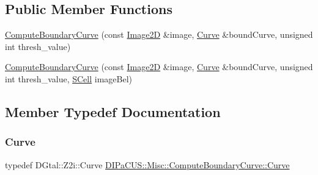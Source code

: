 \subsection*{Public Member Functions}
\begin{DoxyCompactItemize}
\item 
\mbox{\hyperlink{structDIPaCUS_1_1Misc_1_1ComputeBoundaryCurve_ae2d9570a6bc09a61cb38eb6375729f94}{Compute\+Boundary\+Curve}} (const \mbox{\hyperlink{structDIPaCUS_1_1Misc_1_1ComputeBoundaryCurve_a67511f091a6fb85b38f29a4df3f480dd}{Image2D}} \&image, \mbox{\hyperlink{structDIPaCUS_1_1Misc_1_1ComputeBoundaryCurve_ac3d7adcd3d9b37d2166c65346e0916d2}{Curve}} \&bound\+Curve, unsigned int thresh\+\_\+value)
\item 
\mbox{\hyperlink{structDIPaCUS_1_1Misc_1_1ComputeBoundaryCurve_a822855aabf08a913095310ab5a5acfa5}{Compute\+Boundary\+Curve}} (const \mbox{\hyperlink{structDIPaCUS_1_1Misc_1_1ComputeBoundaryCurve_a67511f091a6fb85b38f29a4df3f480dd}{Image2D}} \&image, \mbox{\hyperlink{structDIPaCUS_1_1Misc_1_1ComputeBoundaryCurve_ac3d7adcd3d9b37d2166c65346e0916d2}{Curve}} \&bound\+Curve, unsigned int thresh\+\_\+value, \mbox{\hyperlink{structDIPaCUS_1_1Misc_1_1ComputeBoundaryCurve_affd97ae2b7fea729fca28c9a4bb16fd5}{S\+Cell}} image\+Bel)
\end{DoxyCompactItemize}


\subsection{Member Typedef Documentation}
\mbox{\label{structDIPaCUS_1_1Misc_1_1ComputeBoundaryCurve_ac3d7adcd3d9b37d2166c65346e0916d2}} 
\subsubsection{\texorpdfstring{Curve}{Curve}}
{\footnotesize\ttfamily typedef D\+Gtal\+::\+Z2i\+::\+Curve \mbox{\hyperlink{structDIPaCUS_1_1Misc_1_1ComputeBoundaryCurve_ac3d7adcd3d9b37d2166c65346e0916d2}{D\+I\+Pa\+C\+U\+S\+::\+Misc\+::\+Compute\+Boundary\+Curve\+::\+Curve}}}

\mbox{\label{structDIPaCUS_1_1Misc_1_1ComputeBoundaryCurve_a7adb0e563e32b1096bde9f5a136e6cbc}} 
